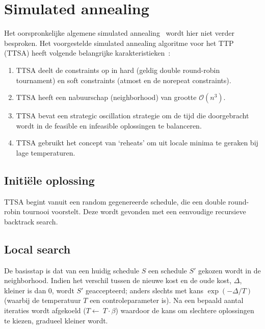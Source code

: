 \documentclass[a4paper,dutch,11pt,]{scrartcl}
\begin{document}
\section{Simulated annealing}
Het oorspronkelijke algemene simulated annealing~\cite{metaheuristics,simulatedannealing} wordt hier niet verder besproken. 
Het voorgestelde simulated annealing algoritme voor het TTP (TTSA) heeft volgende belangrijke karakteristieken~\cite{paper}:

\begin{enumerate}
\item TTSA deelt de constraints op in hard (geldig double round-robin tournament) en soft constraints (atmost en de norepeat constraints).
\item TTSA heeft een nabuurschap (neighborhood) van grootte $\mathcal{O}(n^3)$.
\item TTSA bevat een strategic oscillation strategie om de tijd die doorgebracht wordt in de feasible en infeasible oplossingen te balanceren.
\item TTSA gebruikt het concept van `reheats' om uit locale minima te geraken bij lage temperaturen.
\end{enumerate}
%

\subsection*{Initi\"ele oplossing}
TTSA begint vanuit een random gegenereerde schedule, die een double round-robin tournooi voorstelt. Deze wordt gevonden met een eenvoudige recursieve backtrack search.

\subsection*{Local search}
De basisstap is dat van een huidig schedule $S$ een schedule $S'$ gekozen wordt in de neighborhood. 
Indien het verschil tussen de nieuwe kost en de oude kost, $\Delta$, kleiner is dan 0, wordt $S'$ geaccepteerd; anders slechts met kans $\exp({-\Delta{}/T})$ (waarbij de temperatuur $T$ een controleparameter is).  Na een bepaald aantal iteraties wordt afgekoeld ($T\leftarrow\ T\cdot\beta$) waardoor de kans om slechtere oplossingen te kiezen, gradueel kleiner wordt.
\end{document}

